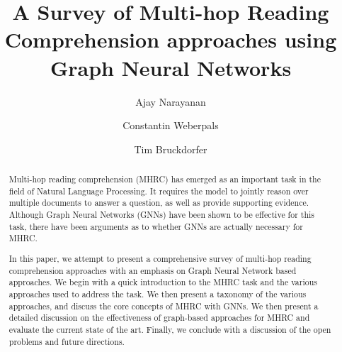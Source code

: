 \documentclass[sigplan,screen]{acmart}
\begin{document}
\title{A Survey of Multi-hop Reading Comprehension approaches using Graph Neural Networks}

\author{Ajay Narayanan}

\author{Constantin Weberpals}

\author{Tim Bruckdorfer}



\begin{abstract}
  Multi-hop reading comprehension (MHRC)  has emerged as an important task in the field of Natural Language Processing. It requires the model to 
  jointly reason over multiple documents to answer a question, as well as provide supporting evidence. Although Graph Neural Networks (GNNs) 
  have been shown to be effective for this task, there have been arguments as to whether GNNs are actually necessary for MHRC.

  In this paper, we attempt to present a comprehensive survey of multi-hop reading comprehension approaches with an emphasis on 
  Graph Neural Network based approaches. We begin with a quick introduction to the MHRC task and the various approaches used to address
  the task. We then present a taxonomy of the various approaches, and discuss the core concepts of MHRC with GNNs. We then present a detailed 
  discussion on the effectiveness of graph-based approaches for MHRC and evaluate the current state of the art. Finally, we conclude with a 
  discussion of the open problems and future directions.
\end{abstract}

\maketitle
\end{document}
